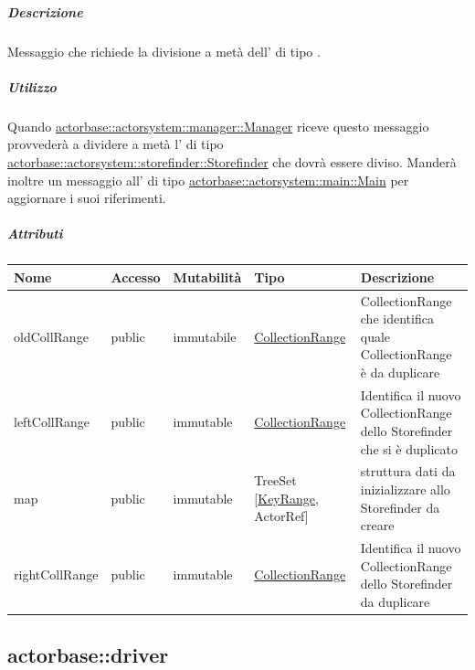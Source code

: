 \documentclass{scalatekids-article}
\begin{document}
\subparagraph{Descrizione}

Messaggio che richiede la divisione a metà dell' di tipo
.

\subparagraph{Utilizzo}

Quando \hyperref[sec:actorbase::actorsystem::manager::Manager]{actorbase::\allowbreak{}actorsystem::\allowbreak{}manager::\allowbreak{}Manager}
riceve questo messaggio provvederà a dividere a metà l' di tipo
\hyperref[sec:actorbase::actorsystem::storefinder::Storefinder]{actorbase::\allowbreak{}actorsystem::\allowbreak{}storefinder::\allowbreak{}Storefinder}
che dovrà essere diviso. Manderà inoltre un messaggio all' di tipo
\hyperref[sec:actorbase::actorsystem::main::Main]{actorbase::\allowbreak{}actorsystem::\allowbreak{}main::\allowbreak{}Main}
per aggiornare i suoi riferimenti.

\subparagraph{Attributi}
\begin{tabular}{| p{3cm} | p{1.5cm} | p{2cm} | p{2cm} | p{8.5cm} |}
  \hline
  Nome & Accesso & Mutabilità & Tipo & Descrizione \\
  \hline
  oldCollRange & public & immutabile & \hyperref[sec:actorbase::actorsystem::utils::CollectionRange]{CollectionRange} & CollectionRange che identifica quale CollectionRange è da duplicare \\
  \hline
  leftCollRange & public & immutable & \hyperref[sec:actorbase::actorsystem::utils::CollectionRange]{CollectionRange} & Identifica il nuovo CollectionRange dello Storefinder che si è duplicato \\
  \hline
  map & public & immutable & TreeSet [\hyperref[sec:actorbase::actorsystem::utils::KeyRange]{KeyRange}, ActorRef] & struttura dati da inizializzare allo Storefinder da creare\\
  \hline
  rightCollRange & public & immutable & \hyperref[sec:actorbase::actorsystem::utils::CollectionRange]{CollectionRange} & Identifica il nuovo CollectionRange dello Storefinder da duplicare \\
  \hline
\end{tabular}


\subsection{actorbase::driver}
\label{sec:actorbase::driver}
\end{document}
